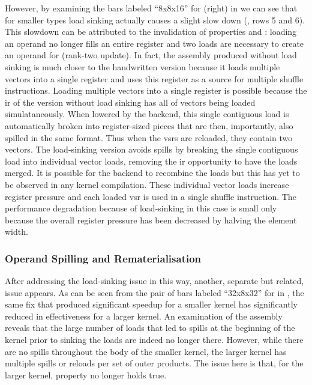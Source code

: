 \documentclass[\main/thesis.tex]{subfiles}
\begin{document}
However, by examining the bars labeled ``8x8x16'' for  (right) in  we can see that for smaller types load sinking actually causes a slight slow down (, rows 5 and 6).
This slowdown can be attributed to the invalidation of properties  and : loading an  operand no longer fills an entire register and two loads are necessary to create an operand for  (rank-two update).
In fact, the assembly produced without load sinking is much closer to the handwritten version because it loads multiple vectors into a single register and uses this register as a source for multiple shuffle instructions.
Loading multiple vectors into a single register is possible because the \gls{ir} of the version without load sinking has all of vectors being loaded simulataneously.
When lowered by the backend, this single contiguous load is automatically broken into register-sized pieces that are then, importantly, also spilled in the same format.
Thus when the \glspl{vsr} are reloaded, they contain two  vectors.
The load-sinking version avoids spills by breaking the single contiguous load into individual vector loads, removing the \gls{ir} opportunity to have the loads merged.
It is possible for the backend to recombine the loads but this has yet to be observed in any kernel compilation.
These individual vector loads increase register pressure and each loaded \gls{vsr} is used in a single shuffle instruction.
The performance degradation because of load-sinking in this case is small only because the overall register pressure has been decreased by halving the element width.

\subsubsection{Operand Spilling and Rematerialisation}
After addressing the load-sinking issue in this way, another, separate but related, issue appears.
As can be seen from the pair of bars labeled ``32x8x32'' for  in , the same fix that produced significant speedup for a smaller kernel has significantly reduced in effectiveness for a larger kernel.
An examination of the assembly reveals that the large number of loads that led to spills at the beginning of the kernel prior to sinking the loads are indeed no longer there.
However, while there are no spills throughout the body of the smaller kernel, the larger kernel has multiple spills or reloads per set of outer products.
The issue here is that, for the larger kernel, property  no longer holds true.
\end{document}
